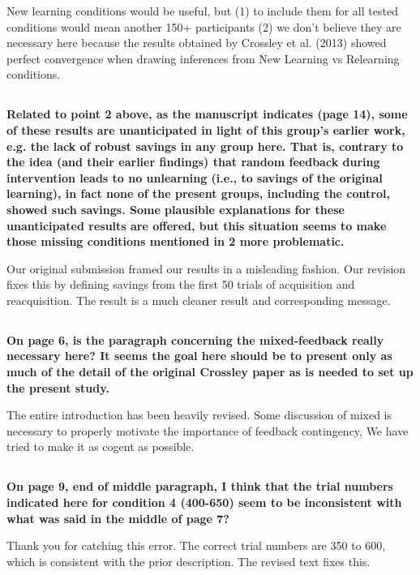 \documentclass[10pt,a4paper]{article}
\begin{document}
New learning conditions would be useful, but (1) to include them for all tested
conditions would mean another 150+ participants (2) we don't believe they are
necessary here because the results obtained by Crossley et al. (2013) showed
perfect convergence when drawing inferences from New Learning vs Relearning
conditions.

\subsection{} \textbf{
  Related to point 2 above, as the manuscript indicates (page 14), some of these
  results are unanticipated in light of this group's earlier work, e.g. the lack
  of robust savings in any group here. That is, contrary to the idea (and their
  earlier findings) that random feedback during intervention leads to no
  unlearning (i.e., to savings of the original learning), in fact none of the
  present groups, including the control, showed such savings. Some plausible
  explanations for these unanticipated results are offered, but this situation
  seems to make those missing conditions mentioned in 2 more problematic.
}

Our original submission framed our results in a misleading fashion. Our revision
fixes this by defining savings from the first 50 trials of acquisition and
reacquisition. The result is a much cleaner result and corresponding message.

\subsection{} \textbf{
  On page 6, is the paragraph concerning the mixed-feedback really necessary here?
  It seems the goal here should be to present only as much of the detail of the
  original Crossley paper as is needed to set up the present study.
}

The entire introduction has been heavily revised. Some discussion of mixed is
necessary to properly motivate the importance of feedback contingency, We have
tried to make it as cogent as possible.

\subsection{} \textbf{
  On page 9, end of middle paragraph, I think that the trial numbers indicated
  here for condition 4 (400-650) seem to be inconsistent with what was said in the
  middle of page 7?
}

Thank you for catching this error. The correct trial numbers are 350 to 600,
which is consistent with the prior description. The revised text fixes this.
\end{document}
